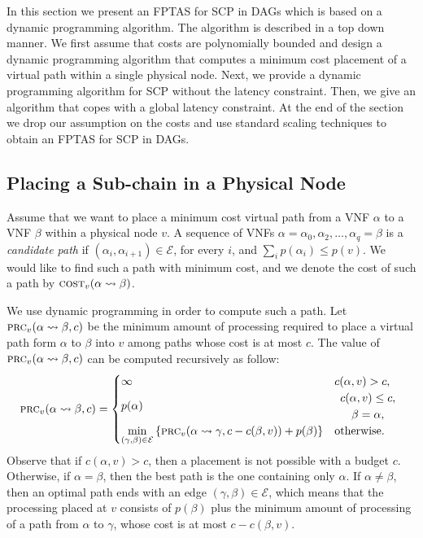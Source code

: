 \documentclass[11pt]{article}
\newcommand{\set}[1]{\left\{ #1 \right\}}
\newcommand{\scp}{\textsc{SCP}\xspace}
\newcommand{\calE}{\mathcal{E}}
\newcommand{\cost}{\textsc{cost}\xspace}
\newcommand{\process}{\textsc{prc}\xspace}
\begin{document}
In this section we present an FPTAS for \scp in DAGs which is based on
a dynamic programming algorithm.
%
The algorithm is described in a top down manner.  We first assume that
costs are polynomially bounded and design a dynamic programming
algorithm that computes a minimum cost placement of a virtual path
within a single physical node.  Next, we provide a dynamic programming
algorithm for \scp without the latency constraint.  Then, we give an
algorithm that copes with a global latency constraint.  At the end of
the section we drop our assumption on the costs and use standard
scaling techniques to obtain an FPTAS for \scp in DAGs.


\subsection{Placing a Sub-chain in a Physical Node}

Assume that we want to place a minimum cost virtual path from a VNF
$\alpha$ to a VNF $\beta$ within a physical node $v$.  A sequence of
VNFs $\alpha = \alpha_0,\alpha_2,\ldots,\alpha_q = \beta$ is a
\emph{candidate path} if $(\alpha_i,\alpha_{i+1}) \in \calE$, for
every $i$, and $\sum_i p(\alpha_i) \leq p(v)$.  We would like to find
such a path with minimum cost, and we denote the cost of such a path
by $\cost_v(\alpha \leadsto \beta)$.

We use dynamic programming in order to compute such a path.  Let
$\process_v(\alpha \leadsto \beta,c)$ be the minimum amount of
processing required to place a virtual path form $\alpha$ to $\beta$
into $v$ among paths whose cost is at most $c$.
%
The value of $\process_v(\alpha \leadsto \beta,c)$ can be computed
recursively as follow:
\[
\process_v(\alpha \leadsto \beta, c) =
\begin{cases}
\infty    & c(\alpha,v) > c, \\
p(\alpha) &
\begin{array}{c}
c(\alpha,v) \leq c, \\
\beta = \alpha,
\end{array}
\\
\displaystyle
\min_{(\gamma,\beta) \in \calE}
   \set{\process_v(\alpha \leadsto \gamma, c - c(\beta,v)) + p(\beta)}
          & \text{otherwise}.
\end{cases}
\]
Observe that if $c(\alpha,v) > c$, then a placement is not possible
with a budget $c$.  Otherwise, if $\alpha = \beta$, then the best path
is the one containing only $\alpha$.  If $\alpha \neq \beta$, then an
optimal path ends with an edge $(\gamma,\beta) \in \calE$, which means
that the processing placed at $v$ consists of $p(\beta)$ plus the
minimum amount of processing of a path from $\alpha$ to $\gamma$,
whose cost is at most $c - c(\beta,v)$.
\end{document}

